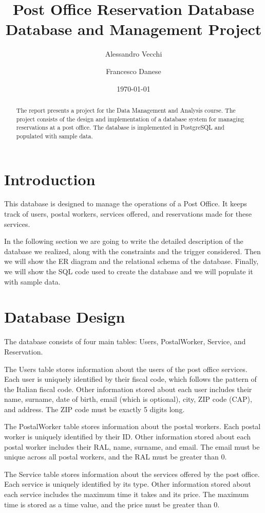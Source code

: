 \documentclass{article}
\title{Post Office Reservation Database \\ \large Database and Management Project}
\author{Alessandro Vecchi \and Francesco Danese}
\date{\today}
\begin{document}
\maketitle

\begin{abstract}
The report presents a project for the Data Management and Analysis course. The project consists of the design and implementation of a database system for managing reservations at a post office. The database is implemented in PostgreSQL and populated with sample data.
\end{abstract}

\section{Introduction}
This database is designed to manage the operations of a Post Office. It keeps track of users, postal workers, services offered, and reservations made for these services.

In the following section we are going to write the detailed description of the database we realized, along with the constraints and the trigger considered. Then we will show the ER diagram and the relational schema of the database. Finally, we will show the SQL code used to create the database and we will populate it with sample data.
\section{Database Design}
The database consists of four main tables: Users, PostalWorker, Service, and Reservation.

The Users table stores information about the users of the post office services. Each user is uniquely identified by their fiscal code, which follows the pattern of the Italian fiscal code. Other information stored about each user includes their name, surname, date of birth, email (which is optional), city, ZIP code (CAP), and address. The ZIP code must be exactly 5 digits long.

The PostalWorker table stores information about the postal workers. Each postal worker is uniquely identified by their ID\@. Other information stored about each postal worker includes their RAL, name, surname, and email. The email must be unique across all postal workers, and the RAL must be greater than 0.

The Service table stores information about the services offered by the post office. Each service is uniquely identified by its type. Other information stored about each service includes the maximum time it takes and its price. The maximum time is stored as a time value, and the price must be greater than 0.
\end{document}
